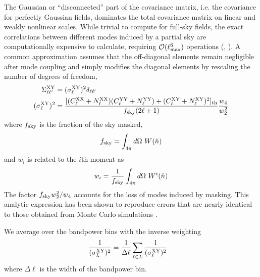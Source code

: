 The Gaussian or ``disconnected'' part of the covariance matrix, i.e. the covariance for perfectly Gaussian fields, dominates the total covariance matrix on linear and weakly nonlinear scales. While trivial to compute for full-sky fields, the exact correlations between different modes induced by a partial sky are computationally expensive to calculate, requiring $\mathcal{O}(\ell_{\rm max}^6)$ operations (\citealt{Efstathiou04b}, \citealt{Garcia++19}). A common approximation assumes that the off-diagonal elements remain negligible after mode coupling and simply modifies the diagonal elements by rescaling the number of degrees of freedom,
\begin{align}\label{eq:cov_gen}
    \Sigma^{\rm XY}_{\ell\ell^{\prime}}  &= (\sigma^{\rm XY}_{\ell})^2 \delta_{\ell \ell^{\prime}} \\ 
    (\sigma^{\rm XY}_{\ell})^2 &= \frac{[(C^{\rm XX}_{\ell}+N^{\rm XX}_{\ell})(C^{\rm YY}_{\ell}+N^{\rm YY}_{\ell}) + (C^{\rm XY}_{\ell} + N^{\rm XY}_{\ell})^2]_{\rm th}}{f_{\rm sky}(2\ell + 1)}\frac{w_4}{w_2^2} \nonumber
\end{align}
where $f_{\rm sky}$ is the fraction of the sky masked,
\begin{equation}
    f_{\rm sky} = \int_{4\pi}d\Omega \ W(\hat{n})
\end{equation}
and $w_i$ is related to the $i$th moment as
\begin{equation}
    w_i = \frac{1}{f_{\rm sky}}\int_{4\pi}d\Omega \ W^{i}(\hat{n})
\end{equation}
The factor $f_{\rm sky}w_2^2/w_4$ accounts for the loss of modes induced by masking. This analytic expression has been shown to reproduce errors that are nearly identical to those obtained from Monte Carlo simulations \citep{MASTER}.

We average over the bandpower bins with the inverse weighting
\begin{align}
    \frac{1}{(\sigma_{L}^{\rm XY})^2} &= \frac{1}{\Delta \ell} \sum_{\ell \in L} \frac{1}{(\sigma_{\ell}^{\rm XY})^2}
\end{align}
where $\Delta \ell$ is the width of the bandpower bin.

